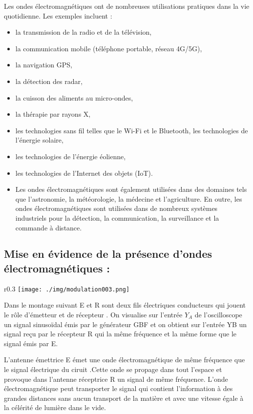 \documentclass[12pt]{article}
\begin{document}
Les ondes électromagnétiques ont de nombreuses utilisations pratiques dans la vie quotidienne. Les exemples incluent :
\begin{itemize}
	\item la transmission de la radio et de la télévision,
	\item la communication mobile (téléphone portable, réseau 4G/5G),
	\item la navigation GPS,
	\item la détection des radar,
	\item la cuisson des aliments au micro-ondes,
	\item la thérapie par rayons X,
\item les technologies sans fil telles que le Wi-Fi et le Bluetooth, les technologies de l'énergie solaire,
\item les technologies de l'énergie éolienne,
\item les technologies de l'Internet des objets (IoT).
\item Les ondes électromagnétiques sont également utilisées dans des domaines tels que l'astronomie, la météorologie, la médecine et l'agriculture. En outre, les ondes électromagnétiques sont utilisées dans de nombreux systèmes industriels pour la détection, la communication, la surveillance et la commande à distance.

\end{itemize}
\subsection{Mise en évidence de la présence d'ondes électromagnétiques :}
\begin{wrapfigure}{r}{0.3\textwidth}
	\texttt{[image: ./img/modulation003.png]}
\end{wrapfigure}

Dans le montage suivant E et R sont deux fils électriques conducteurs qui jouent le rôle d'émetteur et de récepteur .
On visualise sur l'entrée $Y_A$ de l'oscilloscope un signal sinusoïdal émis par le générateur GBF et on obtient sur l'entrée YB un
signal reçu par le récepteur R qui la même fréquence et la même forme que le signal émis par E.


L'antenne émettrice E émet une onde électromagnétique de même fréquence que le signal électrique du ciruit .Cette onde se
propage dans tout l'espace et provoque dans l'antenne réceptrice R un signal de même fréquence.
L'onde électromagnétique peut transporter le signal qui contient l'information à des grandes distances sans aucun transport de
la matière et avec une vitesse égale à la célérité de lumière dans le vide.
\end{document}
